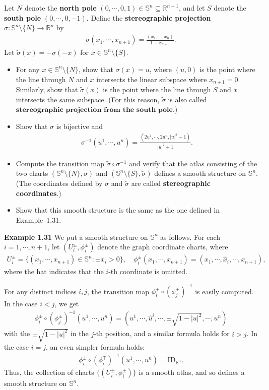 Let $N$ denote the \textbf{north pole} $(0,\cdots,0,1)\in \mathbb{S}^n\subseteq \mathbb{R}^{n+1}$, and let $S$ denote the \textbf{south pole} $(0,\cdots,0,-1)$. Define the \textbf{stereographic projection} $\sigma:\mathbb{S}^n\setminus \{N\}\to \mathbb{R}^n$ by
\begin{align}
    \sigma(x_1,\cdots,x_{n+1})=\frac{(x_1,\cdots,x_n)}{1-x_{n+1}}.
\end{align}
Let $\tilde{\sigma}(x)=-\sigma(-x)$ for $x\in \mathbb{S}^n\setminus \{S\}$. 
\begin{itemize}
    \item [(a)] For any $x\in \mathbb{S}^n\setminus \{N\}$, show that $\sigma(x)=u$, where $(u,0)$ is the point where the line through $N$ and $x$ intersects the linear subspace where $x_{n+1}=0$. Similarly, show that $\tilde{\sigma}(x)$ is the point where the line through $S$ and $x$ intersects the same subspace. (For this reason, $\tilde{\sigma}$ is also called $\textbf{stereographic projection from the south pole}$.)  
    \item [(b)] Show that $\sigma$ is bijective and 
    \begin{align}
        \sigma^{-1}(u^1,\cdots,u^n)=\frac{(2u^1,\cdots,2u^n, |u|^2-1)}{|u|^2+1}.
    \end{align}
    \item [(c)] Compute the transition map $\tilde{\sigma}\circ \sigma^{-1}$ and verify that the atlas consisting of the two charts $(\mathbb{S}^n\setminus \{N\},\sigma)$ and $(\mathbb{S}^n\setminus \{S\},\tilde{\sigma})$ defines a smooth structure on $\mathbb{S}^n$. (The coordinates defined by $\sigma$ and $\tilde{\sigma}$ are called \textbf{stereographic coordinates}.)
    \item [(d)] Show that this smooth structure is the same as the one defined in Example~1.31.
\end{itemize}

\textbf{Example 1.31} We put a smooth structure on $\mathbb{S}^n$ as follows. For each $i=1,\cdots,n+1$, let $(U_i^\pm,\phi_i^\pm)$ denote the graph coordinate charts, where 
\begin{align}
    U_i^\pm=\{(x_1,\cdots,x_{n+1})\in \mathbb{S}^n: \pm x_i>0\},\quad \phi_i^\pm(x_1,\cdots,x_{n+1})=(x_1,\cdots,\hat{x}_i,\cdots,x_{n+1}),
\end{align}
where the hat indicates that the $i$-th coordinate is omitted. 


For any distinct indices $i,j$, the transition map $\phi_i^\pm\circ (\phi_j^\pm)^{-1}$ is easily computed. In the case $i<j$, we get 
\begin{align}
    \phi_i^\pm\circ (\phi_j^\pm)^{-1}(u^1,\cdots,u^{n})=(u^1,\cdots,\hat{u}^{i},\cdots,\pm\sqrt{1-|u|^2},\cdots,u^{n})
\end{align}
with the $\pm\sqrt{1-|u|^2}$ in the $j$-th position, and a similar formula holds for $i>j$. In the case $i=j$, an even simpler formula holds:
\begin{align}
    \phi_i^\pm\circ (\phi_i^\mp)^{-1}(u^1,\cdots,u^{n})=\mathrm{ID}_{\mathbb{B}^n}.
\end{align}
Thus, the collection of charts $\{(U_i^\pm,\phi_i^\pm)\}$ is a smooth atlas, and so defines a smooth structure on $\mathbb{S}^n$.

